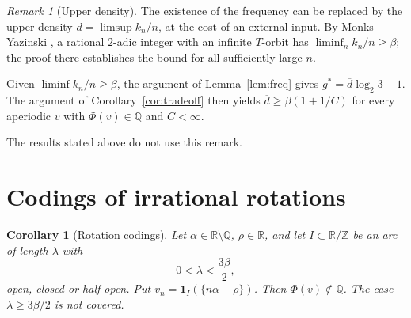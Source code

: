 \documentclass[11pt]{amsart}
\newtheorem{corollary}[theorem]{Corollary}
\theoremstyle{definition}
\theoremstyle{remark}
\newtheorem{remark}[theorem]{Remark}
\newcommand{\Z}{\mathbb{Z}}
\newcommand{\Q}{\mathbb{Q}}
\newcommand{\R}{\mathbb{R}}
\newcommand{\gs}{g^{*}}
\begin{document}
\begin{remark}[Upper density]\label{rem:upper}
The existence of the frequency can be replaced by the upper density $\overline d=\limsup k_n/n$, at the cost of an external input. By Monks--Yazinski \cite[Thm.~2.7(b)]{MY04}, a rational $2$-adic integer with an infinite $T$-orbit has $\liminf_n k_n/n\ge\beta$; the proof there establishes the bound for all sufficiently large $n$.

Given $\liminf k_n/n\ge\beta$, the argument of Lemma~\ref{lem:freq} gives $\gs=\overline d\log_2 3-1$. The argument of Corollary~\ref{cor:tradeoff} then yields $\overline d\ge\beta(1+1/C)$ for every aperiodic $v$ with $\Phi(v)\in\Q$ and $C<\infty$.

The results stated above do not use this remark.
\end{remark}

\section{Codings of irrational rotations}\label{sec:rotation}

\begin{corollary}[Rotation codings]\label{cor:rotation}
Let $\alpha\in\R\setminus\Q$, $\rho\in\R$, and let $I\subset\R/\Z$ be an arc of length $\lambda$ with
\[
0<\lambda<\frac{3\beta}{2},
\]
open, closed or half-open. Put $v_n=\mathbf 1_I(\{n\alpha+\rho\})$. Then $\Phi(v)\notin\Q$. The case $\lambda\ge 3\beta/2$ is not covered.
\end{corollary}
\end{document}
